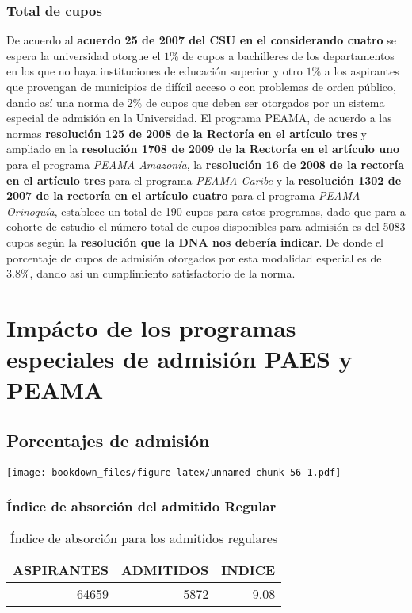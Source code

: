 \documentclass[]{article}
\theoremstyle{definition}
\theoremstyle{definition}
\theoremstyle{definition}
\theoremstyle{remark}
\begin{document}
\subsubsection{Total de cupos}\label{total-de-cupos}

De acuerdo al \textbf{acuerdo 25 de 2007 del CSU en el considerando
cuatro} se espera la universidad otorgue el \(1\%\) de cupos a
bachilleres de los departamentos en los que no haya instituciones de
educación superior y otro \(1\%\) a los aspirantes que provengan de
municipios de difícil acceso o con problemas de orden público, dando así
una norma de \(2\%\) de cupos que deben ser otorgados por un sistema
especial de admisión en la Universidad. El programa PEAMA, de acuerdo a
las normas \textbf{resolución 125 de 2008 de la Rectoría en el artículo
tres} y ampliado en la \textbf{resolución 1708 de 2009 de la Rectoría en
el artículo uno} para el programa \emph{PEAMA Amazonía}, la
\textbf{resolución 16 de 2008 de la rectoría en el artículo tres} para
el programa \emph{PEAMA Caribe} y la \textbf{resolución 1302 de 2007 de
la rectoría en el artículo cuatro} para el programa \emph{PEAMA
Orinoquía}, establece un total de 190 cupos para estos programas, dado
que para a cohorte de estudio el número total de cupos disponibles para
admisión es del 5083 cupos según la \textbf{resolución que la DNA nos
debería indicar}. De donde el porcentaje de cupos de admisión otorgados
por esta modalidad especial es del \(3.8\%\), dando así un cumplimiento
satisfactorio de la norma.

\section{Impácto de los programas especiales de admisión PAES y
PEAMA}\label{impacto-de-los-programas-especiales-de-admision-paes-y-peama}

\subsection{Porcentajes de admisión}\label{porcentajes-de-admision}

\texttt{[image: bookdown\_files/figure-latex/unnamed-chunk-56-1.pdf]}

\subsubsection{Índice de absorción del admitido
Regular}\label{indice-de-absorcion-del-admitido-regular}

\begin{table}

\caption{\label{tab:unnamed-chunk-57}Índice de absorción para los admitidos regulares}
\centering
\begin{tabular}[t]{rrr}
\toprule
ASPIRANTES & ADMITIDOS & INDICE\\
\midrule
64659 & 5872 & 9.08\\
\bottomrule
\end{tabular}
\end{table}
\end{document}
